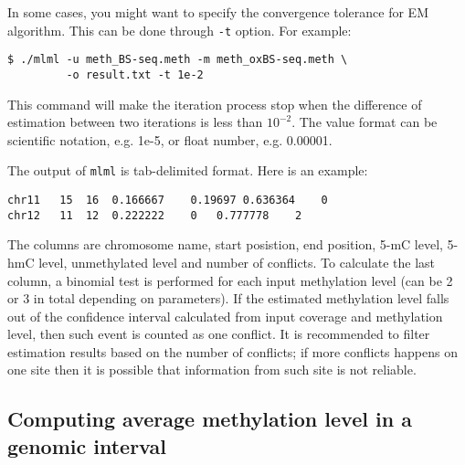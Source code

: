 \documentclass[10pt]{article}
\newcommand{\prog}[1]{\texttt{#1}}
\newcommand{\op}[1]{\texttt{#1}}
\begin{document}
In some cases, you might want to specify the convergence tolerance for EM
algorithm. This can be done through \op{-t} option. For example:
\begin{verbatim}
$ ./mlml -u meth_BS-seq.meth -m meth_oxBS-seq.meth \
         -o result.txt -t 1e-2
\end{verbatim}
This command will make the iteration process stop when the difference of
estimation between two iterations is less than $10^{-2}$. The value format 
can be scientific notation, e.g. 1e-5, or float number, e.g. 0.00001.

The output of \prog{mlml} is tab-delimited format. Here is an example:
\begin{verbatim}
chr11	15	16	0.166667	0.19697	0.636364	0 
chr12	11	12	0.222222	0	0.777778	2
\end{verbatim}
The columns are chromosome name, start posistion, end position, 5-mC level, 
5-hmC level, unmethylated level and number of conflicts. To calculate the last
column, a binomial test is performed for each input methylation level 
(can be 2 or 3 in total depending on parameters). If the estimated 
methylation level falls out of the confidence interval calculated from 
input coverage and methylation level, then such event is counted as one 
conflict. It is recommended to filter estimation results based on the number 
of conflicts; if more conflicts happens on one site then it is possible 
that information from such site is not reliable.

\subsection{Computing average methylation level in a genomic interval}
\label{sec:roimethstat}
\end{document}

